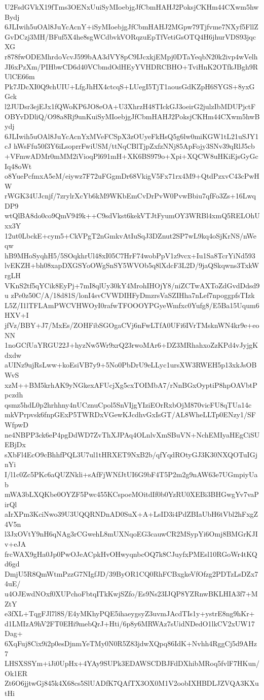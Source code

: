 U2FsdGVkX19fTms3OENxUuiSyMIoebjgJfCbmHAHJ2PoksjCKHm44CXwm5hwBydj
6JLIwih5uOAl8JuYcAcnY+iSyMIoebjgJfCbmHAHJ2MGpw79Tjfvme7NXyf5FllZ
GvDCzj3MH/BFuf5X4he8sgWCdbvkVORqzuEpTfVetiGsOTQ4H6jhurVDS93jqcXG
r878fwODEMhrdoVcvJ599bAA3dVY8pC9IJcxkjEMpj0DTaYeqbN20k2ivp4wVelh
JI6xPzXm/PIHbwCD6d40VCbmdOdHEyYVHDRCBHO+TviHnK2OTfkJBgh9RUlCE66m
Pk7JDcXI0Q9chUIU+LfgJhHX4ctcqS+LUegI5TjT1aousGdKZpH6SYGS+8yxGGck
l2JUDsr3ejEJx1fQWoKP6JO8eOA+U3XhrzH48TIckGJ3oeirG2julzIbMDUPjctF
OBYvDDliQ/O98a8Rj9unKuiSyMIoebjgJfCbmHAHJ2PoksjCKHm44CXwm5hwBydj
6JLIwih5uOAl8JuYcAcnYxMVeFCSpX3zOUyeFkHsQ5g6lw0miKGW1tL21uSJY1cJ
hWsFfu50f3Y6iLsoprrFwiUSM/ttNqCBlTjpZxfzNNj85ApFojy3SNv39qRlJ5cb
+VFmwADMr0mMM2iVioqPl691mH+XK6BS979o+Xpi+XQCW8uHKiEjsGyGcIq48oWt
o8YuePcfmxA5eM/eiywz7F72uFGgmDr68VkigV5Fx71rx4M9+QtdPzxvC43cPwHW
rWGK34UJcnjf/7zrylrXcYb6kM9WKbEmCvDrPvW0PvwBbiu7qfFo3Zs+16LwqDP9
wtQlBA8do0co9QmV949k++C9sdVkst6kekVTJtFyumOY3WRBl4xmQ5RELOhUxx3Y
12ut0LbckE+cym5+CkVPgT2nGmkvAtIuSqJ3DZnut2SP7wL9kq4oSjKrNS/nWeqw
hB9MHoSyqhH5/5SOqkhrUl48xI05C7HrF74wobPpV1z9vcx+Iu1Sa8TcrYiNd593
lvEKZH+bh08xapDXGSYoOWgSnSY5WVOb5q8lXdcF3L2D/9jaQSkqwns3TxkWrgLH
VKnS2tf5qYCik8EyPj+7mI8qlUy30kY4MrohIHOjY8/niZCTwAXToZdGvdDdsd9u
zPe0z50C/A/18d81S/lonI4svCVWDIHFyDmzrsVaSZIHha7nLef7npoggpfsTIzk
L5Z/I1lTFLAmPWCVHWOyI0rafwTFOOOYPGyeWmfxc0Yufg8/E5Ba15Uqum6HXV+I
jfVz/BBY+J7/MxEs/ZOHFibSGOgaCVj6nFwLTfA0UFi6IVrTMsknWN4kr9e+eoNN
1noGCfUaYRGU22J+hyzNw5Wr9xrQ23rwoMAr6+DZ3MRhahxoZzKPd4vJyjgKdxdw
aUINz9ujRsLww+koEsiVB7y9+5No0PbDrU9eLLyc1ursXW3RWEH5p13xkJsOBWvS
xzM++BM5krhAK9yNGkexAFUcjXg5cxTOIMbA7/rNnBGxOyptiP8hpOAVbtPpczdh
qsmz5hdL0p2hrhhny4nUCznuCpol5SnVIjgYIziEOrRxbOjM870vicFU8qTUa14c
mkVPrpvsk6fnpGExP5TWRDxVGewKJcdhvGxIsGT/AL8WheLLTp0ENzy1/SFWfpwD
ne4NBPP3ck6eP4pgDdWD7ZvThXJPAq4OLnlvXmSBuVN+NchEMIyaHEgCiSUEBjDx
sXbFl4EcO9cBhhfPQL3U7ul1tHRXET9NxB2b/qfYqdROtyGJ3K30NXQOTuIGjnYi
I/l1c0Zc5PKc6aQUZNkli+sAfFjWNfJtUI6G9bF4T5P2m2g9nAW63e7UGmpiyUab
mWA3bLXQKbe0OYZF5Pwc455KCspoeMOitdIf0b0YzRU0XEBi3BHGwgYv7vaPirQl
aIrXPm3KciNwo39U3UQQRNDnAD0SuX+A+LsID3i4PdZBIaUbH6tVbl2hFxgZ4V5n
l3JxOVtY9nH6qNAg3rCGwehL8mUXNqoEG3cauwCR2MSypYi6Omj8BMGrKJIv+eJA
frcWAX9gHa0Jp0PwOJeACpkHvOHwyqnbcOQ7k8CJuyfxPMEsl10RGoWr4tKQd6gd
DmjU5R8QmWtmPzzG7NIgfJD/39ByOR1CQ0RhFCBxgkeVfOfzg2PDTzLsDZx74uE/
u4OJEwdNOxf0XUPchoFbtqITkKwjSZfo/Es9Ns23IJQP8YZRnwBKLHIA3f7+MZtY
e3fXL+TqgFJl7l8S/E4yMKhyPQE5ihaeygsyZ3uvmJAcdTIs1y+ystrE8ng9hKr+
d1LMIzA9hV2FT0EHi9mebQrJ+Hti/6p8y6MRWAz7sUidNDedO1lkCV2xUW17Dag+
6XqFuj8Cix9i2p0esDjnmYeTMy0N0R5Z83jdwXQpq86IdK+Nvhh4RggCj5d9AHz7
LHSXSSYm+iJi0UpHx+4YAy9SUPk3EDAWSCDBJFdDXhibMRoq5fvlF7HKun/Ok1ER
Zt6O6jjtwGj845k4X68cs5SlUADfK7QAfTX3OX0M1V2oobIXHBDLJZVQA3KXutHi
